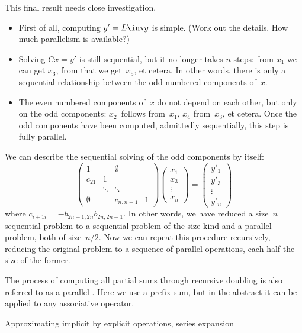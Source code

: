 This final result needs close investigation.
\begin{itemize}
\item First of all, computing $y'=L\inv y$ is simple. (Work out the
  details. How much parallelism is available?)
\item Solving $Cx=y'$ is still sequential, but it no longer takes $n$
  steps: from $x_1$ we can get $x_3$, from that we get~$x_5$, et
  cetera. In other words, there is only a sequential relationship
  between the odd numbered components of~$x$.
\item The even numbered components of~$x$ do not depend on each other,
  but only on the odd components: $x_2$~follows from~$x_1$, $x_4$
  from~$x_3$, et cetera. Once the odd components have been computed,
  admittedly sequentially, this step is fully parallel.
\end{itemize}
We can describe the sequential solving of the odd components by
itself:
\[ 
  \begin{pmatrix}
    1&&\emptyset\\ c_{21}&1\\ &\ddots&\ddots\\ 
    \emptyset&&c_{n,n-1}&1
  \end{pmatrix}
  \begin{pmatrix}
    x_1\\ x_3\\ \vdots\\ x_n
  \end{pmatrix} = 
  \begin{pmatrix}
    y'_1\\ y'_3\\ \vdots\\ y'_n
  \end{pmatrix}
\]
where $c_{i+1i}=-b_{2n+1,2n}b_{2n,2n-1}$. In other words, we have
reduced a size~$n$ sequential problem to a sequential problem of the
size kind and a parallel problem, both of size~$n/2$. Now we can
repeat this procedure recursively, reducing the original problem to a
sequence of parallel operations, each half the size of the former.

The process of computing all partial sums through recursive doubling
is also referred to as a parallel 
. Here we use a prefix sum, but in the abstract it
can be applied to any associative operator.


 {Approximating implicit by explicit operations, series expansion}
\label{sec:implicit-becomes-explicit}

